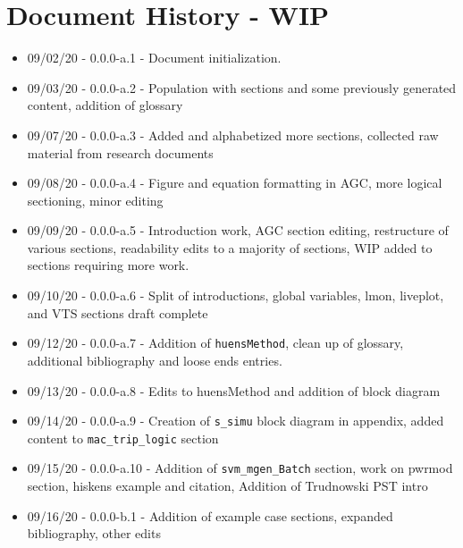 \chapter{Document History  - WIP}

\begin{itemize}
\itemsep 0em
\item 09/02/20 - 0.0.0-a.1 - Document initialization.
\item 09/03/20 - 0.0.0-a.2 - Population with sections and some previously generated content, addition of glossary
\item 09/07/20 - 0.0.0-a.3 - Added and alphabetized more sections, collected raw material from research documents
\item 09/08/20 - 0.0.0-a.4 - Figure and equation formatting in AGC, more logical sectioning, minor editing
\item 09/09/20 - 0.0.0-a.5 - Introduction work, AGC section editing, restructure of various sections, readability edits to a majority of sections, WIP added to sections requiring more work.
\item 09/10/20 - 0.0.0-a.6 - Split of introductions, global variables, lmon, liveplot, and VTS sections draft complete
\item 09/12/20 - 0.0.0-a.7 - Addition of \verb|huensMethod|, clean up of glossary, additional bibliography and loose ends entries.
\item 09/13/20 - 0.0.0-a.8 - Edits to huensMethod and addition of block diagram 
\item 09/14/20 - 0.0.0-a.9 - Creation of \verb|s_simu| block diagram in appendix, added content to \verb|mac_trip_logic| section
\item 09/15/20 - 0.0.0-a.10 - Addition of \verb|svm_mgen_Batch| section, work on pwrmod section, hiskens example and citation, Addition of Trudnowski PST intro
\item 09/16/20 - 0.0.0-b.1 - Addition of example case sections, expanded bibliography, other edits 
\end{itemize}